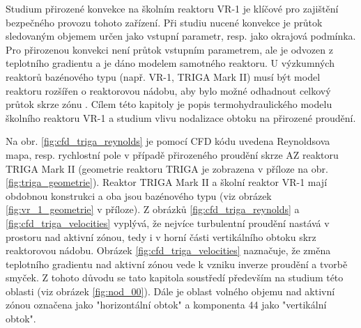 
\label{chap:th_model_vr_1}
Studium přirozené konvekce na školním reaktoru VR-1 je klíčové pro zajištění bezpečného provozu tohoto zařízení. Při studiu nucené konvekce je průtok sledovaným objemem určen jako vstupní parametr, resp. jako okrajová podmínka. Pro přirozenou konvekci není průtok vstupním parametrem, ale je odvozen z teplotního gradientu a je dáno modelem samotného reaktoru. U výzkumných reaktorů bazénového typu (např. VR-1, TRIGA Mark II) musí být model reaktoru rozšířen o reaktorovou nádobu, aby bylo možné odhadnout celkový průtok skrze zónu \cite{TRIGA_CFD}. Cílem této kapitoly je popis termohydraulického modelu školního reaktoru VR-1 a studium vlivu nodalizace obtoku na přirozené proudění.

Na obr. \ref{fig:cfd_triga_reynolds} je pomocí CFD kódu uvedena Reynoldsova mapa, resp. rychlostní pole v případě přirozeného proudění skrze AZ reaktoru TRIGA Mark II (geometrie reaktoru TRIGA je zobrazena v příloze na obr. \ref{fig:triga_geometrie}). Reaktor TRIGA Mark II a školní reaktor VR-1 mají obdobnou konstrukci a oba jsou bazénového typu (viz obrázek \ref{fig:vr_1_geometrie} v příloze). Z obrázků \ref{fig:cfd_triga_reynolds} a \ref{fig:cfd_triga_velocities} vyplývá, že nejvíce turbulentní proudění nastává v prostoru nad aktivní zónou, tedy i v horní části vertikálního obtoku skrz reaktorovou nádobu. Obrázek \ref{fig:cfd_triga_velocities} naznačuje, že změna teplotního gradientu nad aktivní zónou vede k vzniku inverze proudění a tvorbě smyček. Z tohoto důvodu se tato kapitola soustředí především na studium této oblasti (viz obrázek \ref{fig:nod_00}). Dále je oblast volného objemu nad aktivní zónou označena jako "horizontální obtok" a komponenta 44 jako "vertikální obtok".



